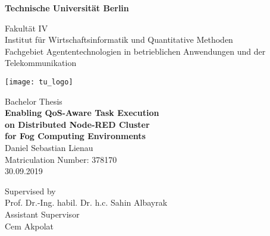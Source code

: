 \thispagestyle{empty}
\begin{center}

{\LARGE \textbf{Technische Universität Berlin}}

\vspace{0.5cm}

{\large Fakultät IV\\[1mm]}
{\large Institut für Wirtschaftsinformatik und Quantitative Methoden\\[1mm]}
{\large Fachgebiet Agententechnologien in betrieblichen Anwendungen und der Telekommunikation\\[5mm]}

\vspace*{1cm}

\texttt{[image: tu\_logo]}

\vspace*{1.0cm}

{\LARGE Bachelor Thesis}\\

\vspace{1.0cm}
{\LARGE \textbf{Enabling QoS-­Aware Task Execution}}\\
\vspace*{0.3cm}
{\LARGE \textbf{on Distributed Node­-RED Cluster}}\\
\vspace*{0.3cm}
{\LARGE \textbf{for Fog Computing Environments}}\\
\vspace*{1.0cm}
{\LARGE Daniel Sebastian Lienau}
\\
\vspace*{0.5cm}
Matriculation Number: 378170\\
30.09.2019\\ %
\vspace*{1.0cm}

Supervised by\\
Prof. Dr.-Ing. habil. Dr. h.c. Sahin Albayrak\\
\vspace*{0.5cm}
Assistant Supervisor\\
Cem Akpolat


\end{center}
